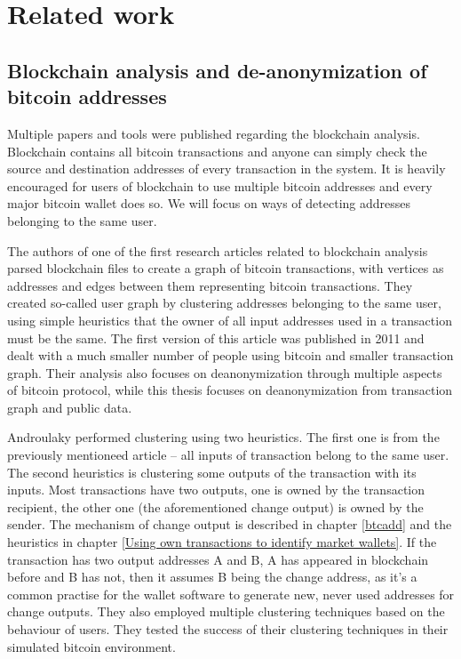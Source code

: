 \documentclass[
  digital, %
  table,   %
  lof,     %
  lot,     %
  oneside
]{fithesis3}
\begin{document}
\chapter{Related work}
\label{relw}
\section{Blockchain analysis and de-anonymization of bitcoin addresses}

Multiple papers and tools were published regarding the blockchain analysis.
Blockchain contains all bitcoin transactions and anyone can simply check
the source and destination addresses of every transaction in the system.
It is heavily encouraged for users of blockchain to use multiple bitcoin addresses
 and every major bitcoin wallet does so.
 We will focus on ways of detecting addresses belonging to the same user.
 
The authors of one \cite{reid2013analysis} of the first research articles related to blockchain analysis
 parsed blockchain files to create a graph of bitcoin transactions, with vertices as addresses
and edges between them representing bitcoin transactions.
 They created so-called user graph by clustering addresses belonging to the same user, using
 simple heuristics that the owner of all input addresses used in a transaction must be the same. The first version of this article  
was published in 2011 and dealt with a much smaller number of people using bitcoin and smaller transaction graph.
Their analysis also focuses on deanonymization through multiple aspects of bitcoin protocol,
while this thesis focuses on deanonymization from transaction graph and public data.

Androulaky \cite{androulaki2013evaluating} performed clustering using two heuristics.
The first one is from the previously mentioneed article \cite{reid2013analysis} -- all inputs of transaction
belong to the same user. The second heuristics is clustering some outputs of the transaction with its inputs.
Most transactions have two outputs, one is owned by the transaction recipient,
the other one (the aforementioned change output) is owned by
the sender. The mechanism of change output is described in chapter \ref{btcadd} and the heuristics in
chapter \ref{Using own transactions to identify market wallets}.
If the transaction has two output addresses A and B, A has appeared in blockchain
before and B has not, then it assumes B being the change address, as it's a common practise
for the wallet software to generate new, never used addresses for change outputs.
They also employed multiple clustering techniques based on the behaviour of users.
 They tested the success of their clustering techniques in their simulated bitcoin 
 environment.
\end{document}
